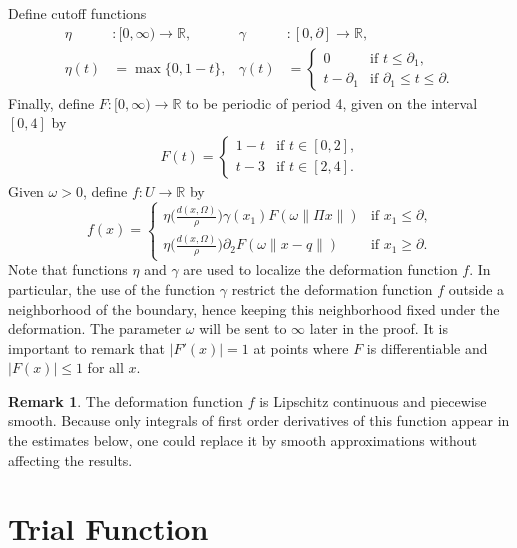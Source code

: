 \documentclass{CUP-JNL-FMP}%
\theoremstyle{definition}
\newtheorem{remark}[theorem]{Remark}
\numberwithin{equation}{section}
\begin{document}
Define cutoff functions
\begin{align*}
  \eta &\colon  [0, \infty) \to \mathbb{R}, & \gamma &\colon  [0, \partial]  \to \mathbb{R}, \\
  \eta(t) &= \max\{0, 1- t\}, &
  \gamma(t) &=
  \begin{cases}
    0 & \text{if $t \leq \partial_1$,} \\
    t - \partial_1 & \text{if $\partial_1 \leq t \leq \partial$}.
  \end{cases}
\end{align*}
Finally, define $F \colon  [0, \infty) \to \mathbb{R}$ to be periodic
of period 4, given on the interval $[0,4]$ by
\begin{align*}
  F(t) = \begin{cases}
    1 - t & \text{if $t \in [0,2]$,}\\
    t - 3 & \text{if  $t \in [2,4]$}.
  \end{cases}
\end{align*}
Given $\omega>0$, define $f \colon  U \rightarrow \mathbb{R}$ by
\begin{equation}\label{eq:deffx}
  f(x) =
  \begin{cases}
    \eta\big(\frac{d(x,\Omega)}{\rho}\big)
    \gamma(x_1) F(\omega \|\Pi x\|) &
    \text{if $x_1 \leq \partial$,} \\
    \eta\big(\frac{d(x, \Omega)}{\rho}\big)
    \partial_2 F(\omega \|x - q \|) & \text{if $x_1 \geq \partial$.}
  \end{cases}
\end{equation}
Note that functions $\eta$ and $\gamma$ are used to localize the deformation function $f$.
In particular, the use of the function $\gamma$ restrict the deformation function $f$ outside a neighborhood of the boundary,
hence keeping this neighborhood fixed under the deformation.
The parameter $\omega$ will be sent to $\infty$ later in the proof.
It is important to remark that $|F'(x)| = 1$ at points where
$F$ is differentiable and $|F(x)| \leq 1$ for all $x$.
\begin{remark}\label{rem:smoothing}
The deformation function $f$ is Lipschitz continuous and piecewise smooth. Because only integrals of first order derivatives of this function appear in the estimates below, one could replace it by smooth approximations without affecting the results.
\end{remark}

\section{Trial Function}\label{section:testfunction}
\end{document}
